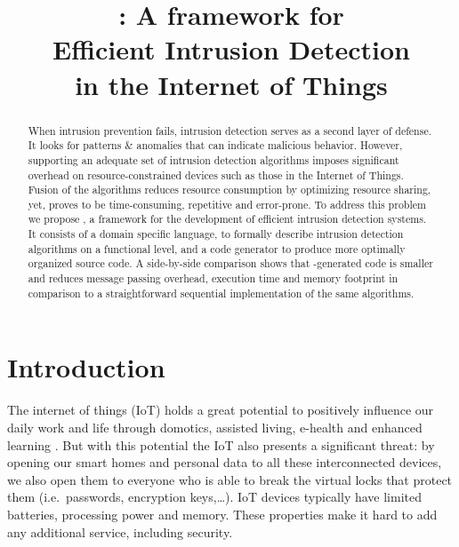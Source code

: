 \documentclass[conference]{IEEEtran}
\begin{document}
\title{
\NAME: A framework for \\
Efficient Intrusion Detection\\
in the Internet of Things
}

\author{%
}

\maketitle

\begin{abstract}

When intrusion prevention fails, intrusion detection serves as a second layer
of defense. It looks for patterns \& anomalies that can indicate malicious
behavior. However, supporting an adequate set of intrusion detection algorithms
imposes significant overhead on resource-constrained devices such as those in
the Internet of Things. Fusion of the algorithms reduces resource consumption
by optimizing resource sharing, yet, proves to be time-consuming, repetitive
and error-prone. To address this problem we propose \NAME, a framework for the
development of efficient intrusion detection systems. It consists of a domain
specific language, to formally describe intrusion detection algorithms on a
functional level, and a code generator to produce more optimally organized
source code. A side-by-side comparison shows that \NAME-generated code is
smaller and reduces message passing overhead, execution time and memory
footprint in comparison to a straightforward sequential implementation of the
same algorithms.

\end{abstract}

\section{Introduction}



The internet of things (IoT) holds a great potential to positively influence
our daily work and life through domotics, assisted living, e-health and
enhanced learning \cite{atzori2010internet}. But with this potential the IoT
also presents a significant threat: by opening our smart homes and personal
data to all these interconnected devices, we also open them to everyone who is
able to break the virtual locks that protect them (i.e.\ passwords, encryption
keys,\dots). IoT devices typically have limited batteries, processing power and
memory. These properties make it hard to add any additional service, including
security.
\end{document}
